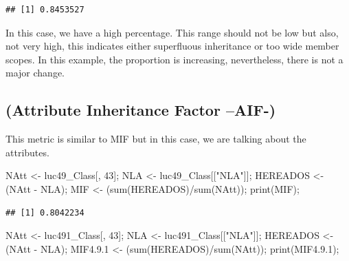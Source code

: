 \documentclass[
]{article}
\newenvironment{Shaded}{\begin{snugshade}}{\end{snugshade}}
\newcommand{\DecValTok}[1]{\textcolor[rgb]{0.00,0.00,0.81}{#1}}
\newcommand{\FloatTok}[1]{\textcolor[rgb]{0.00,0.00,0.81}{#1}}
\newcommand{\FunctionTok}[1]{\textcolor[rgb]{0.00,0.00,0.00}{#1}}
\newcommand{\NormalTok}[1]{#1}
\newcommand{\OtherTok}[1]{\textcolor[rgb]{0.56,0.35,0.01}{#1}}
\newcommand{\SpecialCharTok}[1]{\textcolor[rgb]{0.00,0.00,0.00}{#1}}
\newcommand{\StringTok}[1]{\textcolor[rgb]{0.31,0.60,0.02}{#1}}
\begin{document}
\begin{verbatim}
## [1] 0.8453527
\end{verbatim}

In this case, we have a high percentage. This range should not be low
but also, not very high, this indicates either superfluous inheritance
or too wide member scopes. In this example, the proportion is
increasing, nevertheless, there is not a major change.

\hypertarget{attribute-inheritance-factor-aif-}{%
\subsection{(Attribute Inheritance Factor
--AIF-)}\label{attribute-inheritance-factor-aif-}}

This metric is similar to MIF but in this case, we are talking about the
attributes.

\begin{Shaded}
\begin{Highlighting}[]
\NormalTok{NAtt }\OtherTok{\textless{}{-}}\NormalTok{ luc49\_Class[, }\DecValTok{43}\NormalTok{];}
\NormalTok{NLA }\OtherTok{\textless{}{-}}\NormalTok{ luc49\_Class[[}\StringTok{"NLA"}\NormalTok{]];}
\NormalTok{HEREADOS }\OtherTok{\textless{}{-}}\NormalTok{ (NAtt }\SpecialCharTok{{-}}\NormalTok{ NLA);}
\NormalTok{MIF }\OtherTok{\textless{}{-}}\NormalTok{ (}\FunctionTok{sum}\NormalTok{(HEREADOS)}\SpecialCharTok{/}\FunctionTok{sum}\NormalTok{(NAtt));}
\FunctionTok{print}\NormalTok{(MIF);}
\end{Highlighting}
\end{Shaded}

\begin{verbatim}
## [1] 0.8042234
\end{verbatim}

\begin{Shaded}
\begin{Highlighting}[]
\NormalTok{NAtt }\OtherTok{\textless{}{-}}\NormalTok{ luc491\_Class[, }\DecValTok{43}\NormalTok{];}
\NormalTok{NLA }\OtherTok{\textless{}{-}}\NormalTok{ luc491\_Class[[}\StringTok{"NLA"}\NormalTok{]];}
\NormalTok{HEREADOS }\OtherTok{\textless{}{-}}\NormalTok{ (NAtt }\SpecialCharTok{{-}}\NormalTok{ NLA);}
\NormalTok{MIF4.}\FloatTok{9.1} \OtherTok{\textless{}{-}}\NormalTok{ (}\FunctionTok{sum}\NormalTok{(HEREADOS)}\SpecialCharTok{/}\FunctionTok{sum}\NormalTok{(NAtt));}
\FunctionTok{print}\NormalTok{(MIF4.}\FloatTok{9.1}\NormalTok{);}
\end{Highlighting}
\end{Shaded}
\end{document}

